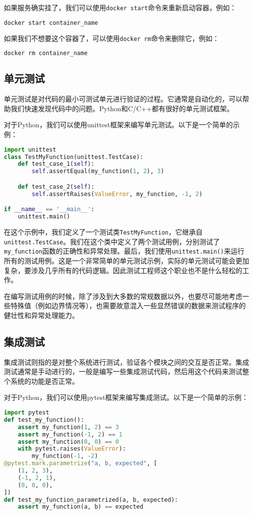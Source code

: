 如果服务确实挂了，我们可以使用\texttt{docker start}命令来重新启动容器，例如：
\begin{lstlisting}[language=bash]
    docker start container_name
\end{lstlisting}

如果我们不想要这个容器了，可以使用\texttt{docker rm}命令来删除它，例如：
\begin{lstlisting}[language=bash]
    docker rm container_name
\end{lstlisting}

\subsection{单元测试}

单元测试是对代码的最小可测试单元进行验证的过程。它通常是自动化的，可以帮助我们快速发现代码中的问题。Python和C/C++都有很好的单元测试框架。

对于Python，我们可以使用unittest框架来编写单元测试。以下是一个简单的示例：
\begin{lstlisting}[language=python]
import unittest
class TestMyFunction(unittest.TestCase):
    def test_case_1(self):
        self.assertEqual(my_function(1, 2), 3)

    def test_case_2(self):
        self.assertRaises(ValueError, my_function, -1, 2)

if __name__ == '__main__':
    unittest.main()
\end{lstlisting}
在这个示例中，我们定义了一个测试类\texttt{TestMyFunction}，它继承自\texttt{unittest.TestCase}。我们在这个类中定义了两个测试用例，分别测试了\texttt{my\_function}函数的正确性和异常处理。最后，我们使用\texttt{unittest.main()}来运行所有的测试用例。这是一个非常简单的单元测试示例，实际的单元测试可能会更加复杂，要涉及几乎所有的代码逻辑。因此测试工程师这个职业也不是什么轻松的工作。

在编写测试用例的时候，除了涉及到大多数的常规数据以外，也要尽可能地考虑一些特殊值（例如边界情况等），也需要故意混入一些显然错误的数据来测试程序的健壮性和异常处理能力。

\subsection{集成测试}

集成测试则指的是对整个系统进行测试，验证各个模块之间的交互是否正常。集成测试通常是手动进行的，一般是编写一些集成测试代码，然后用这个代码来测试整个系统的功能是否正常。

对于Python，我们可以使用pytest框架来编写集成测试。以下是一个简单的示例：
\begin{lstlisting}[language=python]
import pytest
def test_my_function():
    assert my_function(1, 2) == 3
    assert my_function(-1, 2) == 1
    assert my_function(0, 0) == 0
    with pytest.raises(ValueError):
        my_function(-1, -2)
@pytest.mark.parametrize("a, b, expected", [
    (1, 2, 3),
    (-1, 2, 1),
    (0, 0, 0),
])
def test_my_function_parametrized(a, b, expected):
    assert my_function(a, b) == expected
\end{lstlisting}

